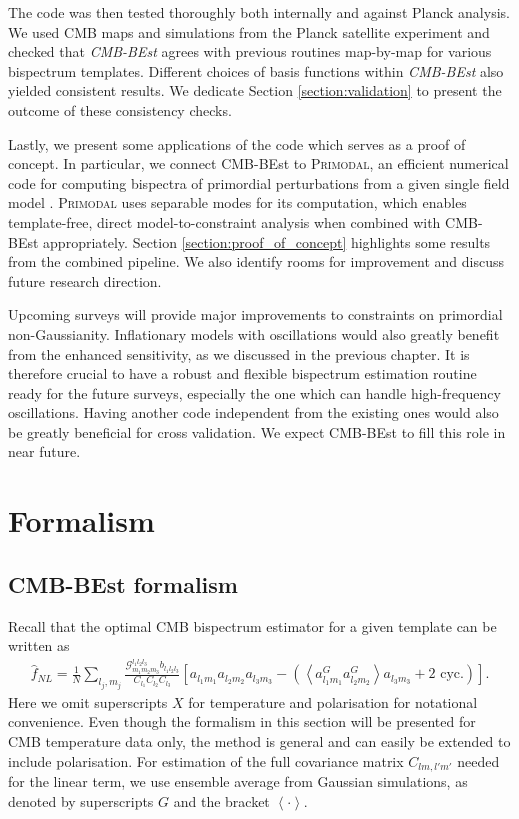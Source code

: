 The code was then tested thoroughly both internally and against Planck analysis. We used CMB maps and simulations from the Planck satellite experiment and checked that \textit{CMB-BEst} agrees with previous routines map-by-map for various bispectrum templates. Different choices of basis functions within \textit{CMB-BEst} also yielded consistent results. We dedicate Section \ref{section:validation} to present the outcome of these consistency checks.

Lastly, we present some applications of the code which serves as a proof of concept. In particular, we connect CMB-BEst to \textsc{Primodal}, an efficient numerical code for computing bispectra of primordial perturbations from a given single field model \cite{Clarke2021}. \textsc{Primodal} uses separable modes for its computation, which enables template-free, direct model-to-constraint analysis when combined with CMB-BEst appropriately. Section \ref{section:proof_of_concept} highlights some results from the combined pipeline. We also identify rooms for improvement and discuss future research direction.

Upcoming surveys will provide major improvements to constraints on primordial non-Gaussianity. Inflationary models with oscillations would also greatly benefit from the enhanced sensitivity, as we discussed in the previous chapter. It is therefore crucial to have a robust and flexible bispectrum estimation routine ready for the future surveys, especially the one which can handle high-frequency oscillations. Having another code independent from the existing ones would also be greatly beneficial for cross validation. We expect CMB-BEst to fill this role in near future.


\section{Formalism}

\subsection{CMB-BEst formalism}
Recall that the optimal CMB bispectrum estimator for a given template can be written as
\begin{align}
	\hat{f}_{NL} = \frac{1}{N} \sum_{l_j,m_j} \frac{\mathcal{G}^{l_1 l_2 l_3}_{m_1 m_2 m_3} b_{l_1 l_2 l_3}}{C_{l_1} C_{l_2} C_{l_3}} \left[ a_{l_1 m_1} a_{l_2 m_2} a_{l_3 m_3} - \left( \left< a^G_{l_1 m_1} a^G_{l_2 m_2} \right> a_{l_3 m_3} + \text{2\ cyc.} \right)  \right].		\label{eqn:bispectrum_estimator_standard}
\end{align}
Here we omit superscripts $X$ for temperature and polarisation for notational convenience. Even though the formalism in this section will be presented for CMB temperature data only, the method is general and can easily be extended to include polarisation. For estimation of the full covariance matrix $C_{lm,l'm'}$ needed for the linear term, we use ensemble average from Gaussian simulations, as denoted by superscripts $G$ and the bracket $\left<\cdot\right>$.

